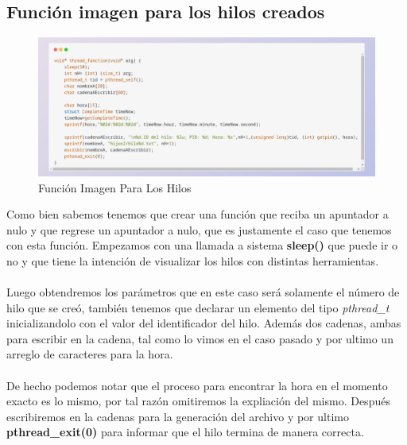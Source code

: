 \documentclass[10pt]{article}
\begin{document}
	\subsection{Función imagen para los hilos creados}
	\begin{figure}[h!]
		\centering
		\includegraphics[width=\linewidth]{funH.png}
		\caption{Función Imagen Para Los Hilos}
		\label{fig:funH}
	\end{figure}
	Como bien sabemos tenemos que crear una función que reciba un apuntador a nulo y que regrese un apuntador a nulo, que es justamente el caso que tenemos con esta función. Empezamos con una llamada a sistema \textbf{sleep()} que puede ir o no y que tiene la intención de visualizar los hilos con distintas herramientas. 
	\\\\
	Luego obtendremos los parámetros que en este caso será solamente el número de hilo que se creó, también tenemos que declarar un elemento del tipo \textit{pthread\_t} inicializandolo con el valor del identificador del hilo. Además dos cadenas, ambas para escribir en la cadena, tal como lo vimos en el caso pasado y por ultimo un arreglo de caracteres para la hora.
	\\\\
	De hecho podemos notar que el proceso para encontrar la hora en el momento exacto es lo mismo, por tal razón omitiremos la expliación del mismo. Después escribiremos en la cadenas para la generación del archivo y por ultimo \textbf{pthread\_exit(0)} para informar que el hilo termina de manera correcta. 
\end{document}
